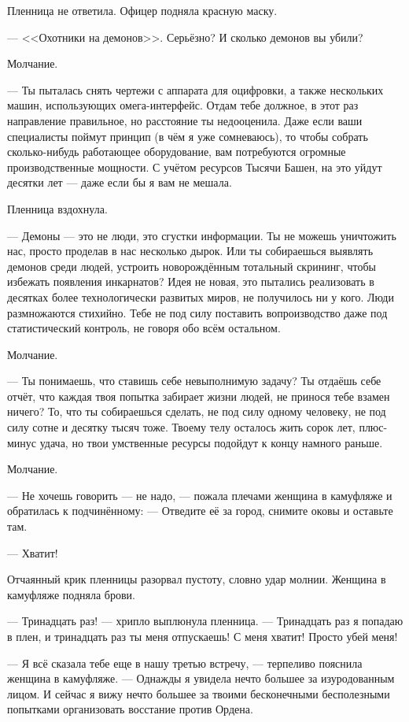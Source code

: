 \documentclass[a4paper,10pt,fleqn]{book}\usepackage{polyglossia}\setdefaultlanguage{english}\setotherlanguage{russian}\defaultfontfeatures{Ligatures=TeX,Mapping=tex-text}\usepackage{xcolor}\definecolor{lightgray}{HTML}{bbbbbb}\color{lightgray}\newcommand{\ml}[3]{\textcolor{black}{#3}}
\begin{document}
Пленница не ответила.
Офицер подняла красную маску.

--- <<Охотники на демонов>>.
Серьёзно?
И сколько демонов вы убили?

Молчание.

--- Ты пыталась снять чертежи с аппарата для оцифровки, а также нескольких машин, использующих омега-интерфейс.
Отдам тебе должное, в этот раз направление правильное, но расстояние ты недооценила.
Даже если ваши специалисты поймут принцип (в чём я уже сомневаюсь), то чтобы собрать сколько-нибудь работающее оборудование, вам потребуются огромные производственные мощности.
С учётом ресурсов Тысячи Башен, на это уйдут десятки лет --- даже если бы я вам не мешала.

Пленница вздохнула.

--- Демоны --- это не люди, это сгустки информации.
Ты не можешь уничтожить нас, просто проделав в нас несколько дырок.
Или ты собираешься выявлять демонов среди людей, устроить новорождённым тотальный скрининг, чтобы избежать появления инкарнатов?
Идея не новая, это пытались реализовать в десятках более технологически развитых миров, не получилось ни у кого.
Люди размножаются стихийно.
Тебе не под силу поставить вопроизводство даже под статистический контроль, не говоря обо всём остальном.

Молчание.

--- Ты понимаешь, что ставишь себе невыполнимую задачу?
Ты отдаёшь себе отчёт, что каждая твоя попытка забирает жизни людей, не принося тебе взамен ничего?
То, что ты собираешься сделать, не под силу одному человеку, не под силу сотне и десятку тысяч тоже.
Твоему телу осталось жить сорок лет, плюс-минус удача, но твои умственные ресурсы подойдут к концу намного раньше.

Молчание.

--- Не хочешь говорить --- не надо, --- пожала плечами женщина в камуфляже и обратилась к подчинённому:
--- Отведите её за город, снимите оковы и оставьте там.

--- Хватит!

Отчаянный крик пленницы разорвал пустоту, словно удар молнии.
Женщина в камуфляже подняла брови.

--- Тринадцать раз! --- хрипло выплюнула пленница.
--- Тринадцать раз я попадаю в плен, и тринадцать раз ты меня отпускаешь!
С меня хватит!
Просто убей меня!

--- Я всё сказала тебе еще в нашу третью встречу, --- терпеливо пояснила женщина в камуфляже.
--- Однажды я увидела нечто большее за изуродованным лицом.
И сейчас я вижу нечто большее за твоими бесконечными бесполезными попытками организовать восстание против Ордена.
\end{document}
